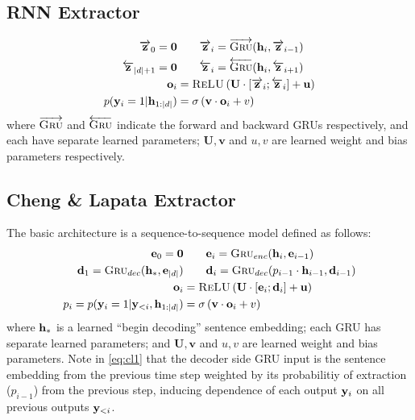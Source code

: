 \begin{appendices}
\subsection{RNN Extractor}

\begin{align}
    \overrightarrow{\mathbf{z}}_0 = \mathbf{0} &\quad\quad   \overrightarrow{\mathbf{z}}_i = \overrightarrow{\textsc{Gru}}(\mathbf{h}_i, \overrightarrow{\mathbf{z}}_{i-1}) \\
    \overleftarrow{\mathbf{z}}_{| d | + 1} = \mathbf{0}&\quad \quad    \overleftarrow{\mathbf{z}}_i = \overleftarrow{\textsc{Gru}}(\mathbf{h}_i, \overleftarrow{\mathbf{z}}_{i+1}) \\
    \mathbf{o}_i &= \textsc{ReLU}\left(\mathbf{U} \cdot [\overrightarrow{\mathbf{z}}_i; \overleftarrow{\mathbf{z}}_i] + \mathbf{u} \right)\\
    p(\mathbf{y}_i=1|\mathbf{h}_{1:| d |}) &= \sigma\left(\mathbf{v}\cdot \mathbf{o}_i + v  \right)
\end{align}
where $\overrightarrow{\textsc{Gru}}$ and $\overleftarrow{\textsc{Gru}}$ indicate the 
forward and backward GRUs respectively, and each have separate learned 
parameters; $\mathbf{U}, \mathbf{v}$ and $u, v$ are learned weight and 
bias parameters respectively.

\subsection{Cheng \& Lapata Extractor}
The basic architecture is a
sequence-to-sequence
model defined as follows:
\begin{align}
    \mathbf{e}_0 = \textbf{0}& \quad \quad   \mathbf{e}_i = \textsc{Gru}_{enc}(\mathbf{h}_i, \mathbf{e}_{i-1}) \\
    \mathbf{d}_1 = \textsc{Gru}_{dec}(\mathbf{h}_*, \mathbf{e}_{| d |}) &\quad\quad
\mathbf{d}_i = \textsc{Gru}_{dec}(p_{i-1} \cdot \mathbf{h}_{i-1}, \mathbf{d}_{i-1}) \label{eq:cl1} \\
\mathbf{o}_i &= \textsc{ReLU}\left(\mathbf{U} \cdot [\mathbf{e}_i; \mathbf{d}_i] + \mathbf{u} \right)\\
p_i = p(\mathbf{y}_i=1|\mathbf{y}_{<i}, \mathbf{h}_{1:| d |}) &= \sigma\left(\mathbf{v}\cdot \mathbf{o}_i + v  \right) 
\end{align}
where $\mathbf{h}_*$ is a learned ``begin decoding'' sentence embedding;
each GRU has separate learned 
parameters; and $\mathbf{U}, \mathbf{v}$ and $u, v$ are learned weight and bias parameters.
Note in \autoref{eq:cl1} that 
the decoder side GRU input is the sentence embedding from the previous time
step weighted by its probabilitiy of extraction ($p_{i-1}$) from the 
previous step, inducing dependence of each output $\mathbf{y}_i$ on all previous 
outputs $\mathbf{y}_{<i}$.


\end{appendices}
